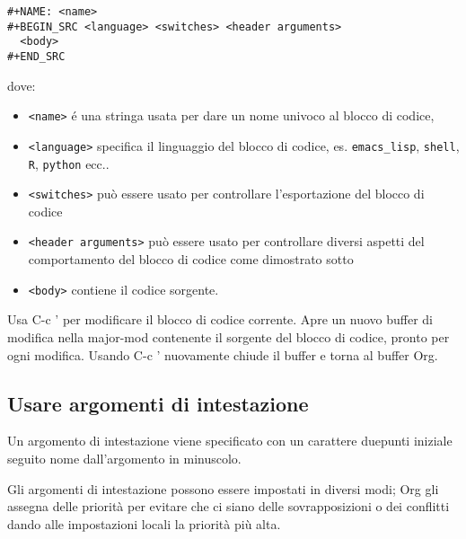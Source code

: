 \documentclass[11pt]{article}
\begin{document}
\begin{verbatim}
#+NAME: <name>
#+BEGIN_SRC <language> <switches> <header arguments>
  <body>
#+END_SRC
\end{verbatim}

dove:

\begin{itemize}
\item \texttt{<name>} é una stringa usata per dare un nome univoco al blocco di
codice,
\item \texttt{<language>} specifica il linguaggio del blocco di codice,
es. \texttt{emacs\_lisp}, \texttt{shell}, \texttt{R}, \texttt{python} ecc..
\item \texttt{<switches>} può essere usato per controllare l'esportazione del
blocco di codice
\item \texttt{<header arguments>} può essere usato per controllare diversi
aspetti del comportamento del blocco di codice come dimostrato sotto
\item \texttt{<body>} contiene il codice sorgente.
\end{itemize}

Usa C-c ' per modificare il blocco di codice corrente. Apre
un nuovo buffer di modifica nella major-mod contenente il sorgente del
blocco di codice, pronto per ogni modifica. Usando C-c '
nuovamente chiude il buffer e torna al buffer Org.

\subsection*{Usare argomenti di intestazione}
\label{sec:orgdf5a339}
Un argomento di intestazione viene specificato con un carattere
duepunti iniziale seguito nome dall'argomento in minuscolo.

Gli argomenti di intestazione possono essere impostati in diversi
modi; Org gli assegna delle priorità per evitare che ci siano delle
sovrapposizioni o dei conflitti dando alle impostazioni locali la
priorità più alta.
\end{document}

